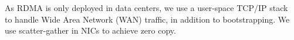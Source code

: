 As RDMA is only deployed in data centers, we use a user-space TCP/IP stack~\cite{dunkels2001design} to handle Wide Area Network (WAN) traffic, in addition to \libipc{} bootstrapping. We use scatter-gather in NICs to achieve zero copy.










